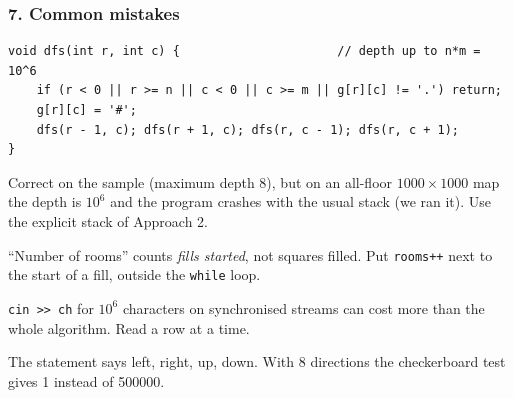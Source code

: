 \subsubsection*{7. Common mistakes}

\begin{warningbox}
\begin{lstlisting}[style=snippet]
void dfs(int r, int c) {                      // depth up to n*m = 10^6
    if (r < 0 || r >= n || c < 0 || c >= m || g[r][c] != '.') return;
    g[r][c] = '#';
    dfs(r - 1, c); dfs(r + 1, c); dfs(r, c - 1); dfs(r, c + 1);
}
\end{lstlisting}
Correct on the sample (maximum depth 8), but on an all-floor $1000\times1000$ map the depth is $10^6$ and the program crashes with the usual stack (we ran it). Use the explicit stack of Approach 2.
\end{warningbox}

\begin{warningbox}
``Number of rooms'' counts \emph{fills started}, not squares filled. Put \texttt{rooms++} next to the start of a fill, outside the \texttt{while} loop.
\end{warningbox}

\begin{warningbox}
\texttt{cin >> ch} for $10^6$ characters on synchronised streams can cost more than the whole algorithm. Read a row at a time.
\end{warningbox}

\begin{warningbox}
The statement says left, right, up, down. With 8 directions the checkerboard test gives 1 instead of 500000.
\begin{center}
\end{center}
\end{warningbox}

